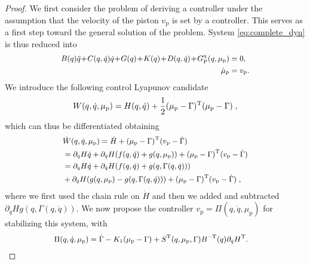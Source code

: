 \begin{proof}
	
	We first consider the problem of deriving a controller under the assumption that the velocity of the piston $v_\mathrm{p}$ is set by a controller. This serves as a first step toward the general solution of the problem. System \eqref{eq:complete_dyn} is thus reduced into
	\begin{equation}\small\label{eq:intermediate}\small
	\begin{split}
	B(q)\ddot{q} \! + \! C(q,\dot{q})\dot{q} \! + \! G(q) \! + \! K(q) \! + \! D(q,\dot{q}) \! + \! G_{\mathrm{P}}^{\mathrm{q}}(q,\mu_\mathrm{p}) &= 0, \\
	\dot{\mu}_\mathrm{p} &= v_\mathrm{p}. 
	\end{split}
	\end{equation}
	We introduce the following control Lyapunov candidate
	\begin{equation}\small
		W(q,\dot{q},\mu_\mathrm{p}) = H(q,\dot{q}) + \frac{1}{2}(\mu_\mathrm{p} - \Gamma)^{\mathrm{T}}(\mu_\mathrm{p} - \Gamma)\;,
	\end{equation}
	which can thus be differentiated obtaining
	\begin{equation}\small
		\begin{split}
			&\dot{W}(q,\dot{q},\mu_\mathrm{p}) = 
			\dot{H} + (\mu_\mathrm{p} - \Gamma)^{\mathrm{T}}(v_\mathrm{p} - \dot\Gamma) \\
			& =  \partial_{q} H \dot{q} + \partial_{\dot{q}} H (f(q,\dot{q}) + g(q,\mu_\mathrm{p})) + (\mu_\mathrm{p} - \Gamma)^{\mathrm{T}}(v_\mathrm{p} - \dot\Gamma) \\
			& = \partial_{q} H \dot{q} + \partial_{\dot{q}} H (f(q,\dot{q}) + g(q,\Gamma(q,\dot{q}))) \\
			&+ \partial_{\dot{q}} H (g(q,\mu_\mathrm{p}) - g(q,\Gamma(q,\dot{q}))) + (\mu_\mathrm{p} - \Gamma)^{\mathrm{T}} (v_\mathrm{p} - \dot\Gamma)\;,
		\end{split}
	\end{equation}
	where we first used the chain rule on $\dot{H}$ and then we added and subtracted $\partial_{\dot{q}} H g(q,\Gamma(q,\dot{q}))$.
	We now propose the controller $v_\mathrm{p} = \Pi(q,\dot{q},\mu_\mathrm{p})$ for stabilizing this system, with
	\begin{equation*}\small
		\begin{split}
			\Pi(q,\dot{q},\mu_\mathrm{p}) &= \dot{\Gamma} - K_1 (\mu_\mathrm{p} - \Gamma) + S^{\mathrm{T}}(q,\mu_\mathrm{p},\Gamma)B^{-\mathrm{T}}(q)\partial_{\dot{q}} H^{\mathrm{T}}.

\end{split}
\end{equation*}
\end{proof}
